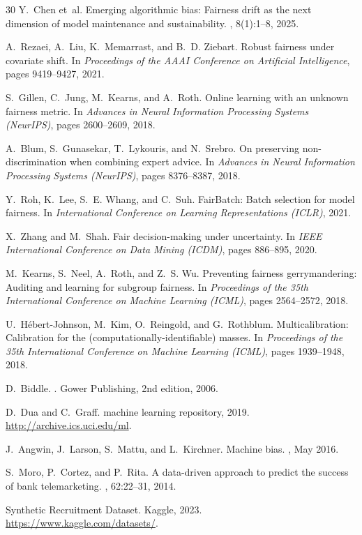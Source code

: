 \documentclass[10pt,twocolumn]{article}
\theoremstyle{definition}
\begin{document}
\begin{thebibliography}{30}
Y.~Chen et~al.
\newblock Emerging algorithmic bias: Fairness drift as the next dimension of model maintenance and sustainability.
, 8(1):1--8, 2025.

A.~Rezaei, A.~Liu, K.~Memarrast, and B.~D. Ziebart.
\newblock Robust fairness under covariate shift.
\newblock In {\em Proceedings of the AAAI Conference on Artificial Intelligence}, pages 9419--9427, 2021.

S.~Gillen, C.~Jung, M.~Kearns, and A.~Roth.
\newblock Online learning with an unknown fairness metric.
\newblock In {\em Advances in Neural Information Processing Systems (NeurIPS)}, pages 2600--2609, 2018.

A.~Blum, S.~Gunasekar, T.~Lykouris, and N.~Srebro.
\newblock On preserving non-discrimination when combining expert advice.
\newblock In {\em Advances in Neural Information Processing Systems (NeurIPS)}, pages 8376--8387, 2018.

Y.~Roh, K.~Lee, S.~E. Whang, and C.~Suh.
\newblock FairBatch: Batch selection for model fairness.
\newblock In {\em International Conference on Learning Representations (ICLR)}, 2021.

X.~Zhang and M.~Shah.
\newblock Fair decision-making under uncertainty.
\newblock In {\em IEEE International Conference on Data Mining (ICDM)}, pages 886--895, 2020.

M.~Kearns, S.~Neel, A.~Roth, and Z.~S. Wu.
\newblock Preventing fairness gerrymandering: Auditing and learning for subgroup fairness.
\newblock In {\em Proceedings of the 35th International Conference on Machine Learning (ICML)}, pages 2564--2572, 2018.

U.~H{\'e}bert-Johnson, M.~Kim, O.~Reingold, and G.~Rothblum.
\newblock Multicalibration: Calibration for the (computationally-identifiable) masses.
\newblock In {\em Proceedings of the 35th International Conference on Machine Learning (ICML)}, pages 1939--1948, 2018.

D.~Biddle.
.
\newblock Gower Publishing, 2nd edition, 2006.

D.~Dua and C.~Graff.
 machine learning repository, 2019.
\newblock \url{http://archive.ics.uci.edu/ml}.

J.~Angwin, J.~Larson, S.~Mattu, and L.~Kirchner.
\newblock Machine bias.
, May 2016.

S.~Moro, P.~Cortez, and P.~Rita.
\newblock A data-driven approach to predict the success of bank telemarketing.
, 62:22--31, 2014.

Synthetic Recruitment Dataset.
\newblock Kaggle, 2023.
\newblock \url{https://www.kaggle.com/datasets/}.

\end{thebibliography}
\end{document}
